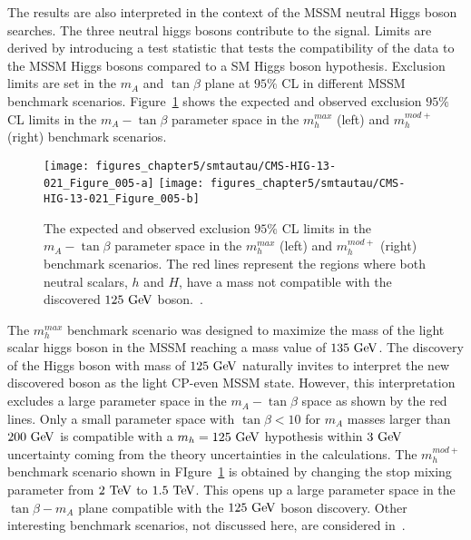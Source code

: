 The results are also interpreted in the context of the MSSM neutral Higgs boson searches. The three neutral higgs bosons contribute to the signal.  Limits are derived by introducing a test statistic that tests the compatibility of the data to the MSSM  Higgs bosons compared to a SM Higgs boson hypothesis. Exclusion limits are set in the $m_{A}$ and $\tan \beta$ plane at $95\%$ CL in different MSSM benchmark scenarios. Figure~\ref{fig:mssmlimit} shows the expected and observed exclusion $95\%$ CL limits in the $m_{A}-\tan\beta$ parameter space in the $m_h^{max}$ (left) and $m_{h}^{mod+}$ (right) benchmark scenarios.
\begin{figure}[htbp]
\centering
\texttt{[image: figures\_chapter5/smtautau/CMS-HIG-13-021\_Figure\_005-a]}
\texttt{[image: figures\_chapter5/smtautau/CMS-HIG-13-021\_Figure\_005-b]}
\caption{The expected and observed exclusion $95\%$ CL limits in the $m_{A}-\tan\beta$ parameter space in the $m_h^{max}$ (left) and $m_{h}^{mod+}$ (right) benchmark scenarios. The red lines represent the regions where both neutral scalars, $h$ and $H$, have a mass not compatible with the discovered $125~\mathrm{Ge\kern -0.1em V}$ boson.~\cite{Khachatryan:2014wca}.}
\label{fig:mssmlimit}
\end{figure}
The $m_{h}^{max}$ benchmark scenario was designed to maximize the mass of the light scalar higgs boson in the MSSM reaching a mass value of $135~\mathrm{Ge\kern -0.1em V}$. The discovery of the Higgs boson with mass of $125~\mathrm{Ge\kern -0.1em V}$ naturally invites to interpret the new discovered boson as the light CP-even MSSM state. However, this interpretation excludes a large parameter space in the $m_{A}-\tan\beta$ space as shown by the red lines. Only a small parameter space with $\tan\beta<10$ for $m_{A}$ masses larger than $200~\mathrm{Ge\kern -0.1em V}$ is compatible with a $m_{h}=125~\mathrm{Ge\kern -0.1em V}$ hypothesis within $3~\mathrm{Ge\kern -0.1em V}$ uncertainty coming from the theory uncertainties in the calculations. The $m_{h}^{mod+}$ benchmark scenario shown in FIgure~\ref{fig:mssmlimit} is obtained by changing the stop mixing parameter from $2~\mathrm{Te\kern -0.1em V}$ to $1.5~\mathrm{Te\kern -0.1em V}$.  This opens up a large parameter space in the $\tan\beta-m_{A}$ plane compatible with the $125~\mathrm{Ge\kern -0.1em V}$ boson discovery. Other interesting benchmark scenarios, not discussed here,  are considered in~\cite{Khachatryan:2014wca}.